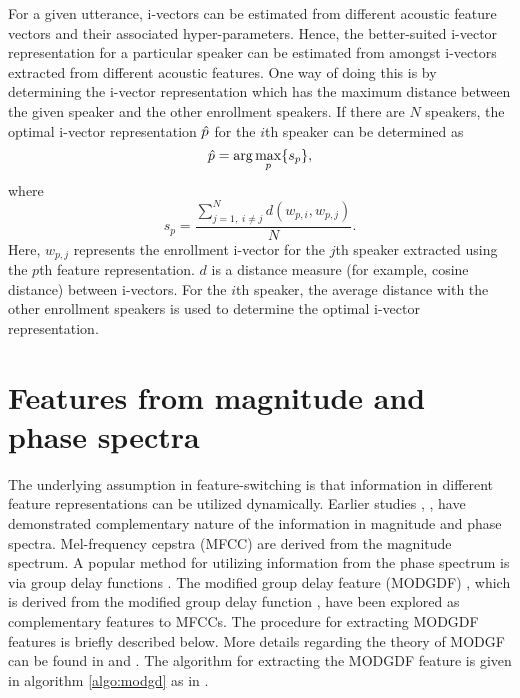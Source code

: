 \documentclass[preprint,12pt,5p]{elsarticle}
\begin{document}
For a given utterance, i-vectors can be estimated from different acoustic
feature vectors and their associated hyper-parameters. Hence, the
better-suited i-vector representation for a particular speaker can be estimated
from amongst i-vectors extracted from different acoustic features. One way of
doing this is by determining the i-vector representation which has the maximum
distance between the given speaker and the other enrollment speakers. If there
are $N$ speakers, the optimal i-vector representation $\Hat{p}$ 
for the $i$th speaker can be determined as
\begin{equation}
\Hat{p} = \arg\max_p \{s_p\},
\label{eq:opt_ivec}
\end{equation}
where 
\begin{equation}
s_p = \frac{\displaystyle \sum_{j=1, \; i \neq j}^N d(w_{p,i},w_{p,j})}{N}.
\label{eq:sp}
\end{equation}
Here, $w_{p,j}$ represents the enrollment i-vector for the $j$th speaker
extracted using the $p$th feature representation. $d$ is a distance measure (for
example, cosine distance) between i-vectors. For the $i$th speaker, the average
distance with the other enrollment speakers is used to determine the optimal
i-vector representation. 

\section{Features from magnitude and phase spectra}
\label{sec:featExt}

The underlying assumption in feature-switching is that information in different
feature representations can be utilized dynamically. Earlier studies
\cite{complement1}, \cite{complement2}, \cite{complement3} have demonstrated
complementary nature of the information in magnitude and phase spectra. Mel-frequency cepstra
(MFCC) are derived from the magnitude spectrum. A popular method for utilizing
information from the phase spectrum is via group delay functions
\cite{group_delay}. The modified group delay feature (MODGDF) \cite{modgd_feat},
which is derived from the modified group delay function \cite{modgd_func}, have
been explored as complementary features to MFCCs. The procedure for extracting
MODGDF features is briefly described below. More details regarding the theory
of MODGF can be found in \cite{modgd_feat} and \cite{modgd_func}. The algorithm
for extracting the MODGDF feature is given in algorithm \ref{algo:modgd} as 
in \cite{hegdeModgdf}.
\end{document}
